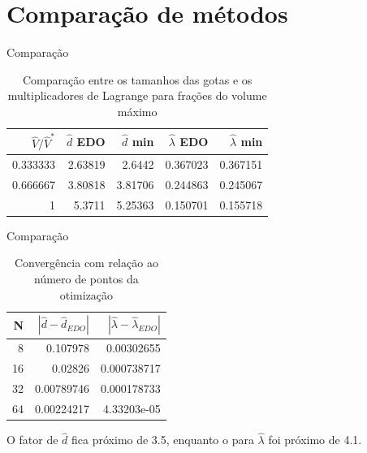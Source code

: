 \documentclass{beamer}
\begin{document}
\section{Comparação de métodos}

\begin{frame}{Comparação}
    \begin{table}
        \centering
        \begin{tabular}{rrrrr}
            \hline
            $\hat{V} / \hat{V}^*$ &   $\hat{d}$ EDO &   $\hat{d}$ min &   $\hat{\lambda}$ EDO &   $\hat{\lambda} $ min \\
            \hline
                            0.333333 &       2.63819 &       2.6442  &            0.367023 &            0.367151 \\
                            0.666667 &       3.80818 &       3.81706 &            0.244863 &            0.245067 \\
                            1        &       5.3711  &       5.25363 &            0.150701 &            0.155718 \\
            \hline
        \end{tabular}
        \caption{Comparação entre os tamanhos das gotas e os multiplicadores de Lagrange para frações do volume máximo}
    \end{table}
\end{frame}

\begin{frame}{Comparação}
    \begin{table}
        \begin{tabular}{rrr}
            \hline
            N &   $|\hat{d} - \hat{d}_{EDO}|$ &   $|\hat{\lambda} - \hat{\lambda}_{EDO}|$ \\
            \hline
            8 &                    0.107978   &                               0.00302655  \\
            16 &                    0.02826    &                               0.000738717 \\
            32 &                    0.00789746 &                               0.000178733 \\
            64 &                    0.00224217 &                               4.33203e-05 \\
            \hline
        \end{tabular}
        \caption{Convergência com relação ao número de pontos da otimização}
    \end{table}

    O fator de $\hat{d}$ fica próximo de 3.5, enquanto o para $\hat{\lambda}$ foi próximo de 4.1.
\end{frame}
\end{document}
